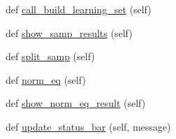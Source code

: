 \begin{DoxyCompactItemize}
\item 
def \hyperlink{classasamba_1_1frontend_1_1_g_u_i_a118685a11c1f7602c17c22bc35419ef2}{call\+\_\+build\+\_\+learning\+\_\+set} (self)
\item 
def \hyperlink{classasamba_1_1frontend_1_1_g_u_i_a2f99fe1402d07c15d79897c8ec0ee4e0}{show\+\_\+samp\+\_\+results} (self)
\item 
def \hyperlink{classasamba_1_1frontend_1_1_g_u_i_a284b5146fbb37994b46e34ce48475f65}{split\+\_\+samp} (self)
\item 
def \hyperlink{classasamba_1_1frontend_1_1_g_u_i_a0e5bd5cd537353b15645f21196606524}{norm\+\_\+eq} (self)
\item 
def \hyperlink{classasamba_1_1frontend_1_1_g_u_i_a863beb8817b0f728771fcb3323afb043}{show\+\_\+norm\+\_\+eq\+\_\+result} (self)
\item 
def \hyperlink{classasamba_1_1frontend_1_1_g_u_i_a9b882f15d916eb942b202888fa29cf12}{update\+\_\+status\+\_\+bar} (self, message)
\end{DoxyCompactItemize}
